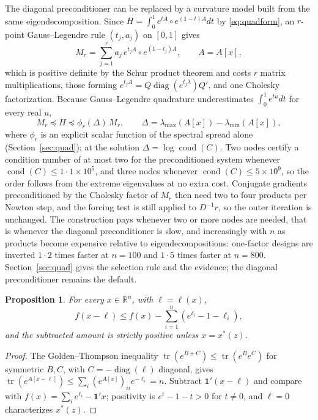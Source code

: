 \documentclass[11pt]{article}
\newcommand{\R}{\mathbb{R}}
\newcommand{\tr}{\operatorname{tr}}
\newcommand{\diag}{\operatorname{diag}}
\newcommand{\one}{\mathbf{1}}
\newtheorem{proposition}{Proposition}
\begin{document}
The diagonal preconditioner can be replaced by a curvature model built
from the same eigendecomposition. Since
$H=\int_0^1e^{tA}\circ e^{(1-t)A}dt$ by \eqref{eq:quadform}, an
$r$-point Gauss--Legendre rule $(t_j,a_j)$ on $[0,1]$ gives
\begin{equation}\label{eq:Mr}
M_r=\sum_{j=1}^{r}a_j\,e^{t_jA}\circ e^{(1-t_j)A},\qquad A=A[x],
\end{equation}
which is positive definite by the Schur product theorem and costs $r$
matrix multiplications, those forming $e^{t_jA}=Q\diag(e^{t_j\lambda})Q'$,
and one Cholesky factorization. Because Gauss--Legendre quadrature
underestimates $\int_0^1e^{tu}dt$ for every real $u$,
\begin{equation}\label{eq:cert}
M_r\preceq H\preceq\phi_r(\Delta)\,M_r,\qquad
\Delta=\lambda_{\max}(A[x])-\lambda_{\min}(A[x]),
\end{equation}
where $\phi_r$ is an explicit scalar function of the spectral spread
alone (Section~\ref{sec:quad}); at the solution
$\Delta=\log\operatorname{cond}(C)$. Two nodes certify a condition
number of at most two for the preconditioned system whenever
$\operatorname{cond}(C)\leq1{\cdot}1\times10^{5}$, and three nodes
whenever $\operatorname{cond}(C)\leq5\times10^{9}$, so the order
follows from the extreme eigenvalues at no extra cost. Conjugate
gradients preconditioned by the Cholesky factor of $M_r$ then need two
to four products per Newton step, and the forcing test is still
applied to $D^{-1}r$, so the outer iteration is unchanged. The
construction pays whenever two or more nodes are needed, that is
whenever the diagonal preconditioner is slow, and increasingly with
$n$ as products become expensive relative to eigendecompositions:
one-factor designs are inverted $1{\cdot}2$ times faster at $n=100$
and $1{\cdot}5$ times faster at $n=800$. Section~\ref{sec:quad} gives
the selection rule and the evidence; the diagonal preconditioner
remains the default.

\begin{proposition}\label{prop:descent}
For every $x\in\R^{n}$, with $\ell=\ell(x)$,
\[
f(x-\ell)\leq f(x)-\sum_{i=1}^{n}(e^{\ell_{i}}-1-\ell_{i}),
\]
and the subtracted amount is strictly positive unless $x=x^{\ast}(z)$.
\end{proposition}

\begin{proof}
The Golden--Thompson inequality $\tr(e^{B+C})\leq\tr(e^{B}e^{C})$ for
symmetric $B,C$, with $C=-\diag(\ell)$ diagonal, gives
$\tr(e^{A[x-\ell]})\leq\sum_{i}(e^{A[x]})_{ii}e^{-\ell_{i}}=n$.
Subtract $\one'(x-\ell)$ and compare with
$f(x)=\sum_{i}e^{\ell_{i}}-\one'x$; positivity is $e^{t}-1-t>0$ for
$t\neq0$, and $\ell=0$ characterizes $x^{\ast}(z)$.
\end{proof}
\end{document}
